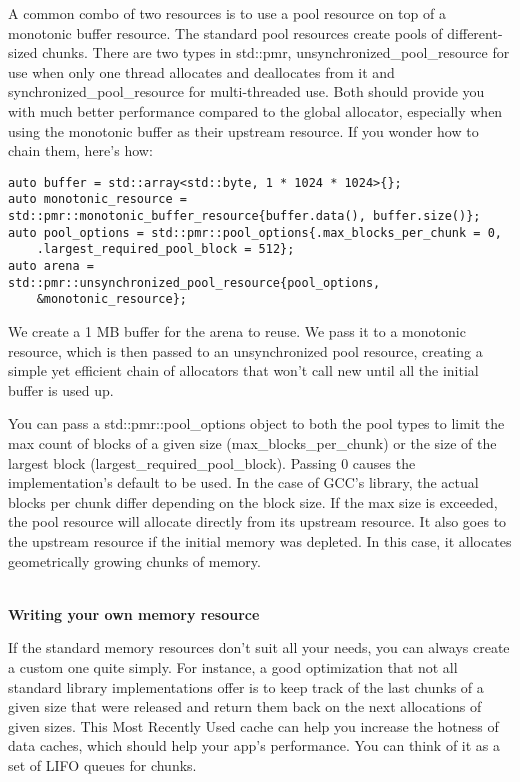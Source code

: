 A common combo of two resources is to use a pool resource on top of a monotonic buffer resource. The standard pool resources create pools of different-sized chunks. There are two types in std::pmr, unsynchronized\_pool\_resource for use when only one thread allocates and deallocates from it and synchronized\_pool\_resource for multi-threaded use. Both should provide you with much better performance compared to the global allocator, especially when using the monotonic buffer as their upstream resource. If you wonder how to chain them, here's how:

\begin{lstlisting}[style=styleCXX]
auto buffer = std::array<std::byte, 1 * 1024 * 1024>{};
auto monotonic_resource =
std::pmr::monotonic_buffer_resource{buffer.data(), buffer.size()};
auto pool_options = std::pmr::pool_options{.max_blocks_per_chunk = 0,
	.largest_required_pool_block = 512};
auto arena =
std::pmr::unsynchronized_pool_resource{pool_options,
	&monotonic_resource};
\end{lstlisting}

We create a 1 MB buffer for the arena to reuse. We pass it to a monotonic resource, which is then passed to an unsynchronized pool resource, creating a simple yet efficient chain of allocators that won't call new until all the initial buffer is used up.

You can pass a std::pmr::pool\_options object to both the pool types to limit the max count of blocks of a given size (max\_blocks\_per\_chunk) or the size of the largest block (largest\_required\_pool\_block). Passing 0 causes the implementation's default to be used. In the case of GCC's library, the actual blocks per chunk differ depending on the block size. If the max size is exceeded, the pool resource will allocate directly from its upstream resource. It also goes to the upstream resource if the initial memory was depleted. In this case, it allocates geometrically growing chunks of memory.

\hspace*{\fill} \\ %
\noindent
\textbf{Writing your own memory resource}

If the standard memory resources don't suit all your needs, you can always create a custom one quite simply. For instance, a good optimization that not all standard library implementations offer is to keep track of the last chunks of a given size that were released and return them back on the next allocations of given sizes. This Most Recently Used cache can help you increase the hotness of data caches, which should help your app's performance. You can think of it as a set of LIFO queues for chunks.

